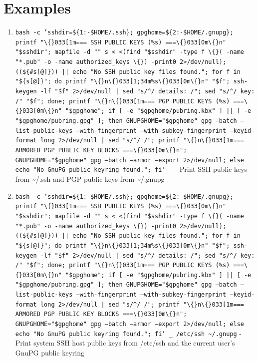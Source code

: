 \documentclass{article}
\begin{document}
\section*{Examples}
\begin{enumerate}
  \item \texttt{bash -c 'sshdir=\$\{1:-\$HOME/.ssh\}; gpghome=\$\{2:-\$HOME/.gnupg\}; printf "\textbackslash\{\}033[1m=== SSH PUBLIC KEYS (\%s) ===\textbackslash\{\}033[0m\textbackslash\{\}n" "\$sshdir"; mapfile -d "" s < <(find "\$sshdir" -type f \textbackslash\{\}( -name "*.pub" -o -name authorized\_keys \textbackslash\{\}) -print0 2>/dev/null); ((\$\{\#s[@]\})) || echo "No SSH public key files found."; for f in "\$\{s[@]\}"; do printf "\textbackslash\{\}n\textbackslash\{\}033[1;34m\%s\textbackslash\{\}033[0m\textbackslash\{\}n" "\$f"; ssh-keygen -lf "\$f" 2>/dev/null | sed "s/\textasciicircum{}/  details: /"; sed "s/\textasciicircum{}/  key: /" "\$f"; done; printf "\textbackslash\{\}n\textbackslash\{\}033[1m=== PGP PUBLIC KEYS (\%s) ===\textbackslash\{\}033[0m\textbackslash\{\}n" "\$gpghome"; if [ -e "\$gpghome/pubring.kbx" ] || [ -e "\$gpghome/pubring.gpg" ]; then GNUPGHOME="\$gpghome" gpg --batch --list-public-keys --with-fingerprint --with-subkey-fingerprint --keyid-format long 2>/dev/null | sed "s/\textasciicircum{}/  /"; printf "\textbackslash\{\}n\textbackslash\{\}033[1m=== ARMORED PGP PUBLIC KEY BLOCKS ===\textbackslash\{\}033[0m\textbackslash\{\}n"; GNUPGHOME="\$gpghome" gpg --batch --armor --export 2>/dev/null; else echo "No GnuPG public keyring found."; fi' \_} - Print SSH public keys from \textasciitilde{}/.ssh and PGP public keys from \textasciitilde{}/.gnupg
  \item \texttt{bash -c 'sshdir=\$\{1:-\$HOME/.ssh\}; gpghome=\$\{2:-\$HOME/.gnupg\}; printf "\textbackslash\{\}033[1m=== SSH PUBLIC KEYS (\%s) ===\textbackslash\{\}033[0m\textbackslash\{\}n" "\$sshdir"; mapfile -d "" s < <(find "\$sshdir" -type f \textbackslash\{\}( -name "*.pub" -o -name authorized\_keys \textbackslash\{\}) -print0 2>/dev/null); ((\$\{\#s[@]\})) || echo "No SSH public key files found."; for f in "\$\{s[@]\}"; do printf "\textbackslash\{\}n\textbackslash\{\}033[1;34m\%s\textbackslash\{\}033[0m\textbackslash\{\}n" "\$f"; ssh-keygen -lf "\$f" 2>/dev/null | sed "s/\textasciicircum{}/  details: /"; sed "s/\textasciicircum{}/  key: /" "\$f"; done; printf "\textbackslash\{\}n\textbackslash\{\}033[1m=== PGP PUBLIC KEYS (\%s) ===\textbackslash\{\}033[0m\textbackslash\{\}n" "\$gpghome"; if [ -e "\$gpghome/pubring.kbx" ] || [ -e "\$gpghome/pubring.gpg" ]; then GNUPGHOME="\$gpghome" gpg --batch --list-public-keys --with-fingerprint --with-subkey-fingerprint --keyid-format long 2>/dev/null | sed "s/\textasciicircum{}/  /"; printf "\textbackslash\{\}n\textbackslash\{\}033[1m=== ARMORED PGP PUBLIC KEY BLOCKS ===\textbackslash\{\}033[0m\textbackslash\{\}n"; GNUPGHOME="\$gpghome" gpg --batch --armor --export 2>/dev/null; else echo "No GnuPG public keyring found."; fi' \_ /etc/ssh \textasciitilde{}/.gnupg} - Print system SSH host public keys from /etc/ssh and the current user's GnuPG public keyring
\end{enumerate}
\end{document}
